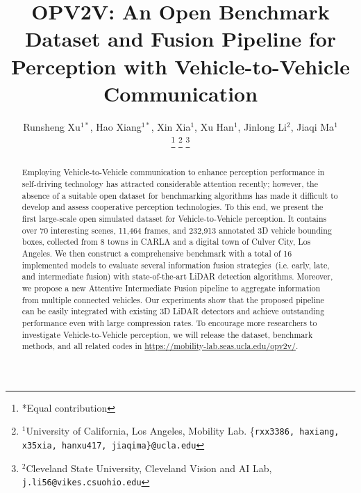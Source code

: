 \documentclass[letterpaper, 10 pt, conference]{ieeeconf}  %
\title{\LARGE \bf
OPV2V: An Open Benchmark Dataset and Fusion Pipeline for Perception with Vehicle-to-Vehicle Communication}
\author{Runsheng Xu$^{1*}$, Hao Xiang$^{1*}$, Xin Xia$^{1}$, Xu Han$^{1}$, Jinlong Li$^{2}$, Jiaqi Ma$^{1}$

\thanks{*Equal contribution}%
\thanks{$^{1}$University of California, Los Angeles, Mobility Lab. {\{\tt\small{rxx3386, haxiang, x35xia, hanxu417, jiaqima}\}}{\tt\small{@ucla.edu}}}%
\thanks{$^{2}$Cleveland State University, Cleveland Vision and AI Lab,
{\tt\small j.li56@vikes.csuohio.edu}}%
}
\begin{document}
 \maketitle
\thispagestyle{empty}
\pagestyle{empty}


\begin{abstract}

Employing Vehicle-to-Vehicle communication to enhance perception performance in self-driving technology has attracted considerable attention recently; however, the absence of a suitable open dataset for benchmarking algorithms has made it difficult to develop and assess cooperative perception technologies. To this end, we present the first large-scale open simulated dataset for Vehicle-to-Vehicle perception. It contains over 70 interesting scenes, 11,464 frames, and 232,913 annotated 3D vehicle bounding boxes, collected from 8 towns in CARLA and a digital town of Culver City, Los Angeles. We then construct a comprehensive benchmark with a total of 16 implemented models to evaluate several information fusion strategies~(i.e. early, late, and intermediate fusion) with state-of-the-art LiDAR detection algorithms. Moreover, we propose a new Attentive Intermediate Fusion pipeline to aggregate information from multiple connected vehicles. Our experiments show that the proposed pipeline can be easily integrated with existing 3D LiDAR detectors and achieve outstanding performance even with large compression rates. To encourage more researchers to investigate Vehicle-to-Vehicle perception, we will release the dataset, benchmark methods, and all related codes in 
\textcolor{blue}{\href{https://mobility-lab.seas.ucla.edu/opv2v/}{https://mobility-lab.seas.ucla.edu/opv2v/}}.






\end{abstract}
\end{document}
